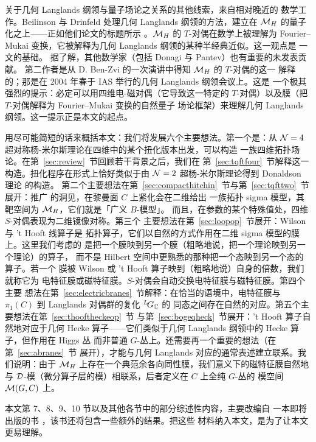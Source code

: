  关于几何 Langlands 纲领与量子场论之关系的其他线索，来自相对晚近的
数学工作。Beilinson 与 Drinfeld 处理几何 Langlands 纲领的方法，建立在
$\MH$ 的量子化之上——正如他们论文的标题所示 \cite{ref5}。${\EUM}_H$
的 $T$-对偶在数学上被理解为 Fourier--Mukai 变换，它被解释为几何
Langlands 纲领的某种半经典近似。这一观点是 \cite{ref24} 一文的基础。
据了解，其他数学家（包括 Donagi 与 Pantev）也有重要的未发表贡献。
第二作者是从 D. Ben-Zvi 的一次演讲中得知 $\MH$ 的 $T$-对偶的这一
解释的；那是在 2004 年春于 IAS 举行的几何 Langlands 纲领会议上。这是
一个极其强烈的提示：必定可以用四维电-磁对偶（它导致这一特定的
$T$-对偶）以及膜（把 $T$-对偶解释为 Fourier--Mukai 变换的自然量子
场论框架）来理解几何 Langlands 纲领。这一提示正是本文的起点。

\cite{ref25}
 用尽可能简短的话来概括本文：我们将发展六个主要想法。第一个是：从
${\EUN}=4$ 超对称杨-米尔斯理论在四维中的某个扭化版本出发，可以构造
一族四维拓扑场论。在第~\ref{sec:review}~节回顾若干背景之后，我们在
第~\ref{sec:tqftfour}~节解释这一构造。扭化程序在形式上恰好类似于由
${\EUN}=2$ 超杨-米尔斯理论得到 Donaldson 理论  的构造。
第二个主要想法在第~\ref{sec:compacthitchin}~节与第~\ref{sec:tqfttwo}~节
展开：推广 \cite{ref18,ref19} 的洞见，在黎曼面 $C$ 上紧化会在二维给出
一族拓扑 sigma 模型，其靶空间为 ${\EUM}_H$，它们就是「广义 $B$-模型」。
而且，在参数的某个特殊值处，四维 $S$-对偶表现为二维镜像对称。第三个
主要想法在第~\ref{sec:loopop}~节展开：Wilson 与 't Hooft 线算子是
拓扑算子，它们以自然的方式作用在二维 sigma 模型的膜上。这里我们考虑的
是把一个膜映到另一个膜（粗略地说，把一个理论映到另一个理论）的算子，
而不是 Hilbert 空间中更熟悉的那种把一个态映到另一个态的算子。若一个
膜被 Wilson 或 't Hooft 算子映到（粗略地说）自身的倍数，我们就称它为
电特征膜或磁特征膜。$S$-对偶会自动交换电特征膜与磁特征膜。第四个主要
想法在第~\ref{sec:electricbranes}~节解释：在恰当的语境中，电特征膜与
$\pi_1(C)$ 到 Langlands 对偶群的复化 $^L\negthinspace G_{\Bbb{C}}$ 的
同态之间存在自然的对应。第五个主要想法在第~\ref{sec:thooftheckeop}~节
与第~\ref{sec:bogeqheck}~节展开：'t Hooft 算子自然地对应于几何 Hecke
算子——它们类似于几何 Langlands 纲领中的 Hecke 算子，但作用在 Higgs 丛
而非普通 $G$-丛上。还需要再一个重要的想法（在第~\ref{sec:abranes}~节
展开），才能与几何 Langlands 对应的通常表述建立联系。我们说明：由于
${\EUM}_H$ 上存在一个典范余各向同性膜，我们意义下的磁特征膜自然地与
${\cal D}$-模（微分算子层的模）相联系，后者定义在 $C$ 上全纯 $G$-丛的
模空间 ${\EUM}(G,C)$ 上。

 本文第 7、8、9、10 节以及其他各节中的部分综述性内容，主要改编自
一本即将出版的书 \cite{ref26}，该书还将包含一些额外的结果。把这些
材料纳入本文，是为了让本文更易理解。


